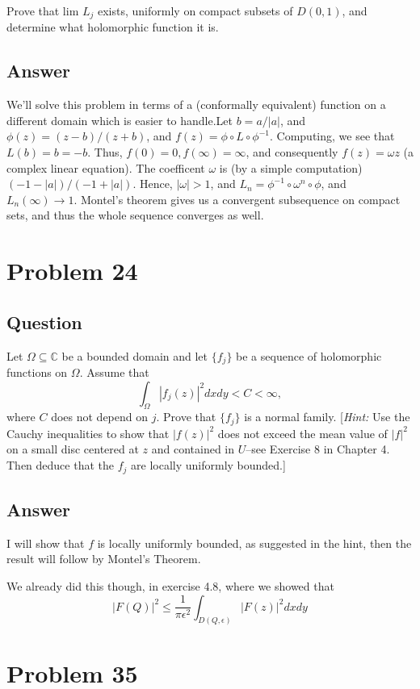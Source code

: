 \documentclass[11pt]{article}
\begin{document}
Prove that lim $ L_j$ exists, uniformly on compact subsets of $D(0,1)$, and determine what holomorphic function it is.
\subsection{Answer}
We'll solve this problem in terms of a (conformally equivalent) function on a different domain which is easier to handle.Let $b = a/ |a|$, and $\phi(z) = (z-b)  / (z+b)$, and $f(z) = \phi \circ L \circ \phi^{-1}$. Computing, we see that $L(b) = b = -b$. Thus, $f(0)=0, f(\infty)=\infty$, and consequently $f(z)=\omega z$ (a complex linear equation). The coefficent $\omega$ is (by a simple computation) $(-1-|a|)/(-1+|a|)$. Hence, $|\omega| > 1$, and $L_n = \phi^{-1} \circ \omega^n \circ \phi$, and $L_n(\infty) \to 1$. Montel's theorem gives us a convergent subsequence on compact sets, and thus the whole sequence converges as well.

\section{Problem 24}
\subsection{Question}
Let $\Omega \subseteq \mathbb{C}$ be a bounded domain and let $\{f_j\}$ be a sequence of holomorphic functions on $\Omega$. Assume that
\[\int_\Omega |f_j (z)|^2 dx dy < C < \infty, \]
where $C$ does not depend on $j$. Prove that $\{f_j\}$ is a normal family. [\emph{Hint: } Use the Cauchy inequalities to show that $|f(z)|^2$ does not exceed the mean value of $|f|^2$ on a small disc centered at $z$ and contained in $U$--see Exercise 8 in Chapter 4. Then deduce that the $f_j$ are locally uniformly bounded.]
\subsection{Answer}

I will show that $f$ is locally uniformly bounded, as suggested in the hint, then the result will follow by Montel's Theorem. 

We already did this though, in exercise 4.8, where we showed that 
\[|F(Q)|^2 \leq \frac{1}{\pi \epsilon^2} \int_{D(Q,\epsilon)}|F(z)|^2 dxdy\]



\section{Problem 35}
\end{document}
